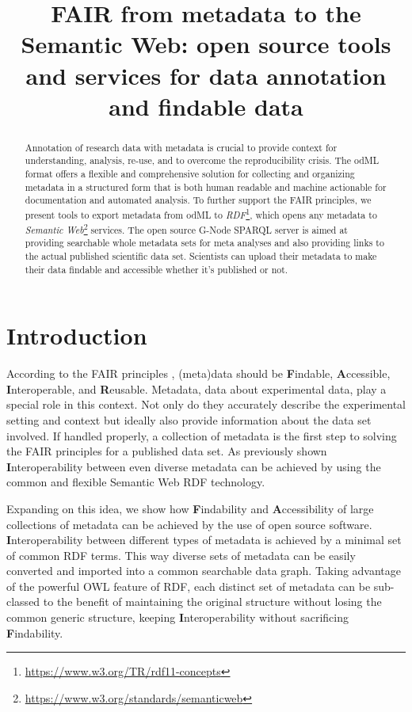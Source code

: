 \documentclass{article}
\title{FAIR from metadata to the Semantic Web: open source tools and services for data annotation and findable data}
\newcommand{\findablility}{\textbf{F}indability}
\newcommand{\findable}{\textbf{F}indable}
\newcommand{\accessibility}{\textbf{A}ccessibility}
\newcommand{\accessible}{\textbf{A}ccessible}
\newcommand{\interoperability}{\textbf{I}nteroperability}
\newcommand{\interoperable}{\textbf{I}nteroperable}
\begin{document}
\maketitle

\begin{abstract}
Annotation of research data with metadata is crucial to provide context for understanding, analysis, re-use, and to overcome the reproducibility crisis. The odML format offers a flexible and comprehensive solution for collecting and organizing metadata in a structured form that is both human readable and machine actionable for documentation and automated analysis. To further support the FAIR principles, we present tools to export metadata from odML to \textit{RDF}\footnote{\url{https://www.w3.org/TR/rdf11-concepts}}, which opens any metadata to \textit{Semantic Web}\footnote{\url{https://www.w3.org/standards/semanticweb}} services. The open source G-Node SPARQL server is aimed at providing searchable whole metadata sets for meta analyses and also providing links to the actual published scientific data set. Scientists can upload their metadata to make their data findable and accessible whether it's published or not.
\end{abstract}

\section{Introduction} \label{sec:introduction}
According to the FAIR principles \cite{Wilkinson_2016}, (meta)data should be \findable{}, \accessible{}, \interoperable{}, and \textbf{R}eusable. Metadata, data about experimental data, play a special role in this context. Not only do they accurately describe the experimental setting and context but ideally also provide information about the data set involved. If handled properly, a collection of metadata is the first step to solving the FAIR principles for a published data set. As previously shown \cite{Teeters_2017} \interoperability{} between even diverse metadata can be achieved by using the common and flexible Semantic Web RDF technology.

Expanding on this idea, we show how \findablility{} and \accessibility{} of large collections of metadata can be achieved by the use of open source software. \interoperability{} between different types of metadata is achieved by a minimal set of common RDF terms. This way diverse sets of metadata can be easily converted and imported into a common searchable data graph. Taking advantage of the powerful OWL feature of RDF, each distinct set of metadata can be sub-classed to the benefit of maintaining the original structure without losing the common generic structure, keeping \interoperability{} without sacrificing \findablility{}.
\end{document}

